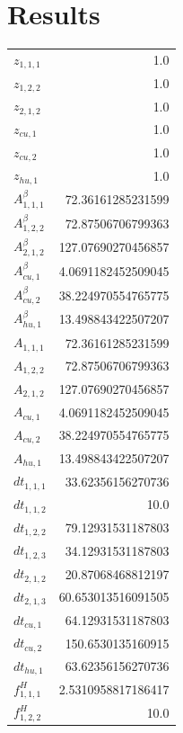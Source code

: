 \documentclass{article}%
\makeatletter
\let\mcnewpage=\newpage%
\newcommand{\TrickSupertabularIntoMulticols}{%
\renewcommand\newpage{%
\if@firstcolumn%
\hrule width\linewidth height0pt%
\columnbreak%
\else%
\mcnewpage%
\fi%
}%
}%
\makeatother
\begin{document}
\section{Results}%
\thispagestyle{plain}%
\begin{multicols*}{3}%
\TrickSupertabularIntoMulticols%
%
\begin{supertabular}{lr}%
	$z_{1,1,1}$ & 1.0 \\%
	$z_{1,2,2}$ & 1.0 \\%
	$z_{2,1,2}$ & 1.0 \\%
	$z_{cu,1}$ & 1.0 \\%
	$z_{cu,2}$ & 1.0 \\%
	$z_{hu,1}$ & 1.0 \\%
	$A_{1,1,1}^{\beta}$ & 72.36161285231599 \\%
	$A_{1,2,2}^{\beta}$ & 72.87506706799363 \\%
	$A_{2,1,2}^{\beta}$ & 127.07690270456857 \\%
	$A_{cu,1}^{\beta}$ & 4.0691182452509045 \\%
	$A_{cu,2}^{\beta}$ & 38.224970554765775 \\%
	$A_{hu,1}^{\beta}$ & 13.498843422507207 \\%
	$A_{1,1,1}$ & 72.36161285231599 \\%
	$A_{1,2,2}$ & 72.87506706799363 \\%
	$A_{2,1,2}$ & 127.07690270456857 \\%
	$A_{cu,1}$ & 4.0691182452509045 \\%
	$A_{cu,2}$ & 38.224970554765775 \\%
	$A_{hu,1}$ & 13.498843422507207 \\%
	$dt_{1,1,1}$ & 33.62356156270736 \\%
	$dt_{1,1,2}$ & 10.0 \\%
	$dt_{1,2,2}$ & 79.12931531187803 \\%
	$dt_{1,2,3}$ & 34.12931531187803 \\%
	$dt_{2,1,2}$ & 20.87068468812197 \\%
	$dt_{2,1,3}$ & 60.653013516091505 \\%
	$dt_{cu,1}$ & 64.12931531187803 \\%
	$dt_{cu,2}$ & 150.6530135160915 \\%
	$dt_{hu,1}$ & 63.62356156270736 \\%
	$f_{1,1,1}^{H}$ & 2.5310958817186417 \\%
	$f_{1,2,2}^{H}$ & 10.0 \\%

\end{supertabular}
\end{multicols*}
\end{document}
